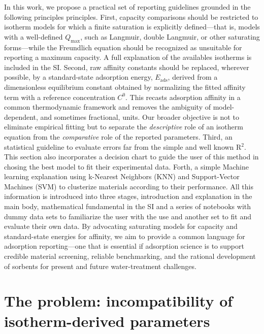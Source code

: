 \documentclass[journal=jacsat,manuscript=article]{achemso}
\begin{document}
	In this work, we propose a practical set of reporting guidelines grounded in the following principles principles. First, capacity comparisons should be restricted to isotherm models for which a finite saturation is explicitly defined---that is, models with a well-defined $Q_\mathrm{max}$, such as Langmuir, double Langmuir, or other saturating forms---while the Freundlich equation should be recognized as unsuitable for reporting a maximum capacity. A full explanation of the availables isotherms is included in the SI.
	Second, raw affinity constants should be replaced, wherever possible, by a standard-state adsorption energy, $E_\mathrm{ads}$, derived from a dimensionless equilibrium constant obtained by normalizing the fitted affinity term with a reference concentration $C^{0}$. This recasts adsorption affinity in a common thermodynamic framework and removes the ambiguity of model-dependent, and sometimes fractional, units. Our broader objective is not to eliminate empirical fitting but to separate the \emph{descriptive} role of an isotherm equation from the \emph{comparative} role of the reported parameters. 
	Third, an statistical guideline to evaluate errors far from the simple and well known R$^2$. This section also incorporates a decision chart to guide the user of this method in chosing the best model to fit their experimental data.
	Forth, a simple Machine learning explanation using k-Nearest Neighbors (KNN) and Support-Vector Machines (SVM) to clusterize materials according to their performance.
	All this information is introduced into three stages, introduction and explanation in the main body, mathematical fundamental in the SI and a series of notebooks with dummy data sets to familiarize the user with the use and another set to fit and evaluate their own data.
	By advocating saturating models for capacity and standard-state energies for affinity, we aim to provide a common language for adsorption reporting---one that is essential if adsorption science is to support credible material screening, reliable benchmarking, and the rational development of sorbents for present and future water-treatment challenges.
	
	\section{The problem: incompatibility of isotherm-derived parameters}
	\label{sec:problem}
\end{document}
